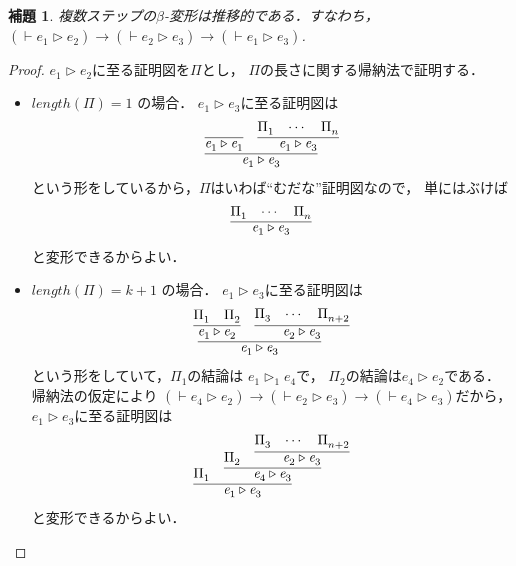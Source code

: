 \documentclass{ltjsbook}%
\newtheorem{lemma}{補題}[section]%
\begin{document}
\begin{lemma}%
  \label{lemma:beta_reduct_trans}%
  複数ステップの$\beta$-変形は推移的である．すなわち，%
  $(\vdash\mathit{e}_1^{}\triangleright\mathit{e}_2^{})\rightarrow%
  (\vdash\mathit{e}_2^{}\triangleright\mathit{e}_3^{})\rightarrow%
  (\vdash\mathit{e}_1^{}\triangleright\mathit{e}_3^{})$.%
\end{lemma}%
\begin{proof}%
  $\mathit{e}_1^{}\triangleright\mathit{e}_2^{}$に至る証明図を$\Pi$とし，%
  $\Pi$の長さに関する帰納法で証明する．%
  \begin{itemize}%
  \item $length(\Pi)=1$ の場合．%
    $\mathit{e}_1^{}\triangleright\mathit{e}_3^{}$に至る証明図は%
    \begin{equation}%
      \infer{%
        \mathit{e}_1^{}\triangleright\mathit{e}_3^{}%
      }{%
        \infer{\mathit{e}_1^{}\triangleright\mathit{e}_1^{}}{}%
      &%
        \infer{\mathit{e}_1^{}\triangleright\mathit{e}_3^{}}{\Pi_1^{}&\cdots&\Pi_n^{}}%
      }%
    \end{equation}%
    という形をしているから，$\Pi$はいわば``むだな''証明図なので，%
    単にはぶけば%
    \begin{equation}%
      \infer{\mathit{e}_1^{}\triangleright\mathit{e}_3^{}}{\Pi_1^{}&\cdots&\Pi_n^{}}%
    \end{equation}%
    と変形できるからよい．%
  \item $length(\Pi)=k + 1$ の場合．%
    $\mathit{e}_1^{}\triangleright\mathit{e}_3^{}$に至る証明図は%
    \begin{equation}%
      \infer{%
        \mathit{e}_1^{}\triangleright\mathit{e}_3^{}%
      }{%
        \infer{%
          \mathit{e}_1^{}\triangleright\mathit{e}_2^{}%
        }{%
          \Pi_1^{}%
        &%
          \Pi_2^{}%
        }%
      &%
        \infer{%
          \mathit{e}_2^{}\triangleright\mathit{e}_3^{}%
        }{%
          \Pi_3^{}&\cdots&\Pi_{n+2}^{}%
        }%
      }%
    \end{equation}%
    という形をしていて，$\Pi_1^{}$の結論は%
    $\mathit{e}_1^{}\triangleright_1^{}\mathit{e}_4^{}$で，%
    $\Pi_2^{}$の結論は$\mathit{e}_4^{}\triangleright\mathit{e}_2^{}$である．%
    帰納法の仮定により%
    $(\vdash\mathit{e}_4^{}\triangleright\mathit{e}_2^{})\rightarrow%
    (\vdash\mathit{e}_2^{}\triangleright\mathit{e}_3^{})\rightarrow%
    (\vdash\mathit{e}_4^{}\triangleright\mathit{e}_3^{})$だから，%
    $\mathit{e}_1^{}\triangleright\mathit{e}_3^{}$に至る証明図は%
    \begin{equation}%
      \infer{%
        \mathit{e}_1^{}\triangleright\mathit{e}_3^{}%
      }{%
        \Pi_1^{}%
      &%
        \infer{%
          \mathit{e}_4^{}\triangleright\mathit{e}_3^{}%
        }{%
          \Pi_2^{}%
        &%
          \infer{%
            \mathit{e}_2^{}\triangleright\mathit{e}_3^{}%
          }{%
            \Pi_3^{}&\cdots&\Pi_{n+2}^{}%
          }%
        }%
      }%
    \end{equation}%
    と変形できるからよい．%
  \end{itemize}%
\end{proof}%
\end{document}
